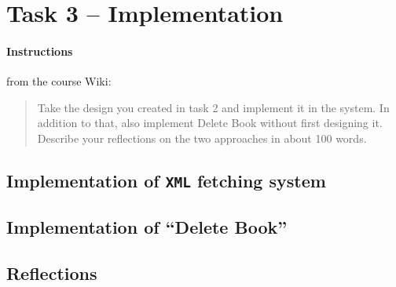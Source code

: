 %
%
%
%


\section{Task 3 -- Implementation}\label{task-3}

\paragraph{Instructions}\label{task-3-instructions}
from the course Wiki\cite{1dv600:lab2:instructions}:

\begin{quote}
  Take the design you created in task 2 and implement it in the system. In
  addition to that, also implement Delete Book without first designing it.
  Describe your reflections on the two approaches in about 100 words.
\end{quote}


\subsection{Implementation of \texttt{XML} fetching system}\label{task-3-xml}
%


\subsection{Implementation of ``Delete Book''}\label{task-3-delete}
%



\subsection{Reflections}\label{task-3-reflect}
%


